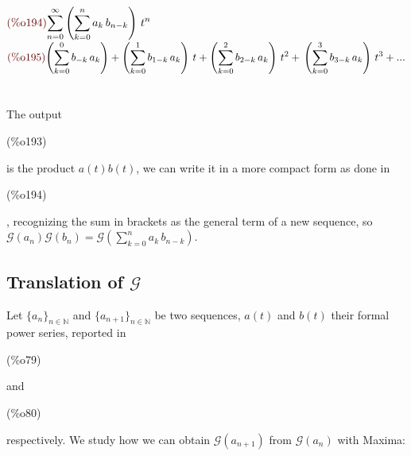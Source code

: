 \begin{math}\displaystyle
\parbox{8ex}{\color{labelcolor}(\%o194) }
\sum_{n=0}^{\infty }\left( \sum_{k=0}^{n}{a}_{k}\,{b}_{n-k}\right) \,{t}^{n}
\end{math}\\
\begin{math}\displaystyle
\parbox{8ex}{\color{labelcolor}(\%o195) }
\left( \sum_{k=0}^{0}{b}_{-k}\,{a}_{k}\right) +\left(
  \sum_{k=0}^{1}{b}_{1-k}\,{a}_{k}\right) \,t+\left(
  \sum_{k=0}^{2}{b}_{2-k}\,{a}_{k}\right) \,{t}^{2}+\\
\left( \sum_{k=0}^{3}{b}_{3-k}\,{a}_{k}\right) \,{t}^{3}+...
\end{math}\\
\\\\
The output \parbox{8ex}{\color{labelcolor}(\%o193) } is the product
$a(t)b(t)$, we can write it in a more compact form as done
in \parbox{8ex}{\color{labelcolor}(\%o194) }, recognizing the sum in brackets as the general term of a new sequence, so
$\mathcal{G}(a_n)\mathcal{G}(b_n) =\mathcal{G}\left(
  \sum_{k=0}^{n}{a}_{k}\,{b}_{n-k}\right)$.

\subsection{Translation of $\mathcal{G} $}

Let $\{a_n\}_{n\in\mathbb{N} }$ and $\{a_{n+1}\}_{n\in\mathbb{N} } $
be two sequences, $a(t)$ and $b(t)$ their formal power series,
reported in \parbox{8ex}{\color{labelcolor}(\%o79) }
and \parbox{8ex}{\color{labelcolor}(\%o80) } respectively. We study
how we can obtain $\mathcal{G}(a_{n+1}) $ from
$\mathcal{G} (a_n)$ with Maxima:\\

